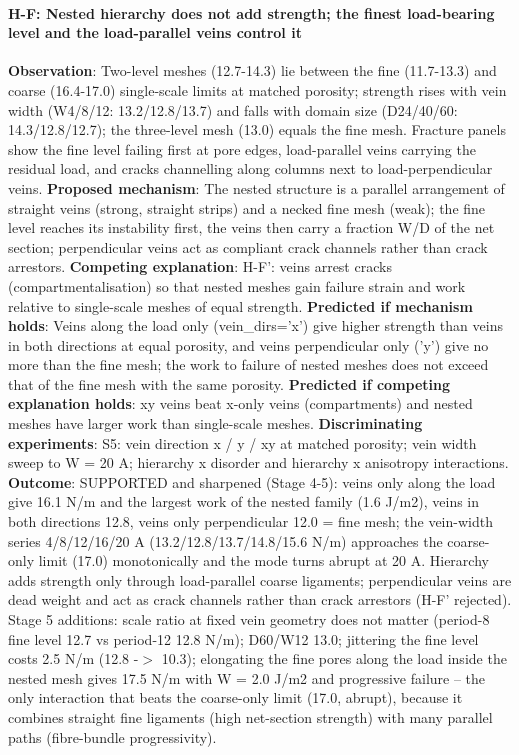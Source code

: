 \paragraph{H-F: Nested hierarchy does not add strength; the finest load-bearing level and the load-parallel veins control it} \textbf{Observation}: Two-level meshes (12.7-14.3) lie between the fine (11.7-13.3) and coarse (16.4-17.0) single-scale limits at matched porosity; strength rises with vein width (W4/8/12: 13.2/12.8/13.7) and falls with domain size (D24/40/60: 14.3/12.8/12.7); the three-level mesh (13.0) equals the fine mesh. Fracture panels show the fine level failing first at pore edges, load-parallel veins carrying the residual load, and cracks channelling along columns next to load-perpendicular veins. \textbf{Proposed mechanism}: The nested structure is a parallel arrangement of straight veins (strong, straight strips) and a necked fine mesh (weak); the fine level reaches its instability first, the veins then carry a fraction W/D of the net section; perpendicular veins act as compliant crack channels rather than crack arrestors. \textbf{Competing explanation}: H-F': veins arrest cracks (compartmentalisation) so that nested meshes gain failure strain and work relative to single-scale meshes of equal strength. \textbf{Predicted if mechanism holds}: Veins along the load only (vein\_dirs='x') give higher strength than veins in both directions at equal porosity, and veins perpendicular only ('y') give no more than the fine mesh; the work to failure of nested meshes does not exceed that of the fine mesh with the same porosity. \textbf{Predicted if competing explanation holds}: xy veins beat x-only veins (compartments) and nested meshes have larger work than single-scale meshes. \textbf{Discriminating experiments}: S5: vein direction x / y / xy at matched porosity; vein width sweep to W = 20 A; hierarchy x disorder and hierarchy x anisotropy interactions. \textbf{Outcome}: SUPPORTED and sharpened (Stage 4-5): veins only along the load give 16.1 N/m and the largest work of the nested family (1.6 J/m2), veins in both directions 12.8, veins only perpendicular 12.0 = fine mesh; the vein-width series 4/8/12/16/20 A (13.2/12.8/13.7/14.8/15.6 N/m) approaches the coarse-only limit (17.0) monotonically and the mode turns abrupt at 20 A. Hierarchy adds strength only through load-parallel coarse ligaments; perpendicular veins are dead weight and act as crack channels rather than crack arrestors (H-F' rejected). Stage 5 additions: scale ratio at fixed vein geometry does not matter (period-8 fine level 12.7 vs period-12 12.8 N/m); D60/W12 13.0; jittering the fine level costs 2.5 N/m (12.8 -$>$ 10.3); elongating the fine pores along the load inside the nested mesh gives 17.5 N/m with W = 2.0 J/m2 and progressive failure -- the only interaction that beats the coarse-only limit (17.0, abrupt), because it combines straight fine ligaments (high net-section strength) with many parallel paths (fibre-bundle progressivity).